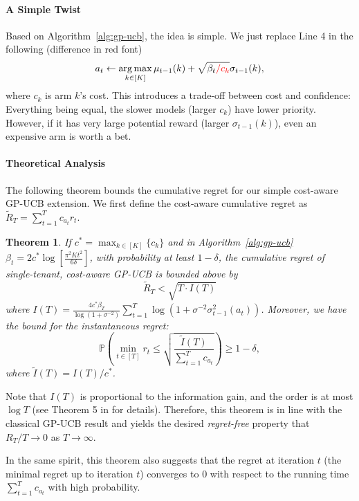\documentclass[letterpaper]{vldb}
\newtheorem{theorem}{Theorem}
\newcommand{\bP}{\mathbb{P}} %
\DeclareMathOperator*{\argmax}{arg\,max}
\begin{document}
\vspace{-0.75em}
\paragraph*{A Simple Twist} Based on Algorithm~\ref{alg:gp-ucb}, the idea is simple. 
We just replace Line 4 in the following (difference in red font)
\[
a_t \leftarrow \argmax_{k\in [K]}\mu_{t-1}(k) + \sqrt{\beta_t \textcolor{red}{/ c_k}}\sigma_{t-1}(k),
\]
where $c_k$ is arm $k$'s cost.
This introduces a trade-off between 
cost and confidence: Everything being equal, 
the slower models (larger $c_k$) have lower priority. However,
if it has very large potential reward (larger $\sigma_{t-1}(k)$),
even an expensive arm is worth a bet.

\vspace{-0.75em}
\paragraph*{Theoretical Analysis}
The following theorem bounds the cumulative regret
for our simple cost-aware GP-UCB extension.
We first define the cost-aware cumulative regret
as $\tilde{R}_T=\sum\nolimits_{t=1}^{T} c_{a_t} r_t$.

\vspace{-0.75em}
\begin{theorem}
  \label{thm:cost}
  If $c^\ast = \max_{k\in [K]}\{c_k\}$ and
  in Algorithm~\ref{alg:gp-ucb}
  $\beta_t = 2c^\ast \log\left[\frac{\pi^2 K t^2}{6\delta}\right]$, with probability at least $1-\delta$,
  the cumulative regret of single-tenant, cost-aware GP-UCB is bounded above by
  \[
  \tilde{R}_T < \sqrt{T\cdot I(T)}
  \]
where $
I(T) = \frac{4c^\ast \beta_T}{\log(1 + \sigma^{-2})}\sum_{t=1}^T \log(1+\sigma^{-2}\sigma^2_{t-1}(a_t))$.
Moreover, we have the bound for the instantaneous regret:
\[
    \bP\left(\min_{t\in [T]}r_t \le \sqrt{\frac{\tilde{I}(T)}{\sum_{t=1}^T
        c_{a_t}}}\right) \ge 1-\delta,
\]
where $\tilde{I}(T) = I(T)/c^\ast$.
\end{theorem}

\vspace{-0.5em}
Note that $I(T)$ is proportional to the information gain, and the order is at most $\log T$ (see Theorem 5 in \cite{SrinivasKKS10} for details). Therefore, this theorem is in line with the classical GP-UCB result and yields the desired \emph{regret-free} property that $R_T/T \to 0$ as $T\to \infty$.

In the same spirit, this theorem also suggests that the regret at iteration $t$ (the minimal regret up to iteration $t$) converges to $0$ with respect to the running time $\sum_{t=1}^T c_{a_t}$ with high probability. 
\end{document}
